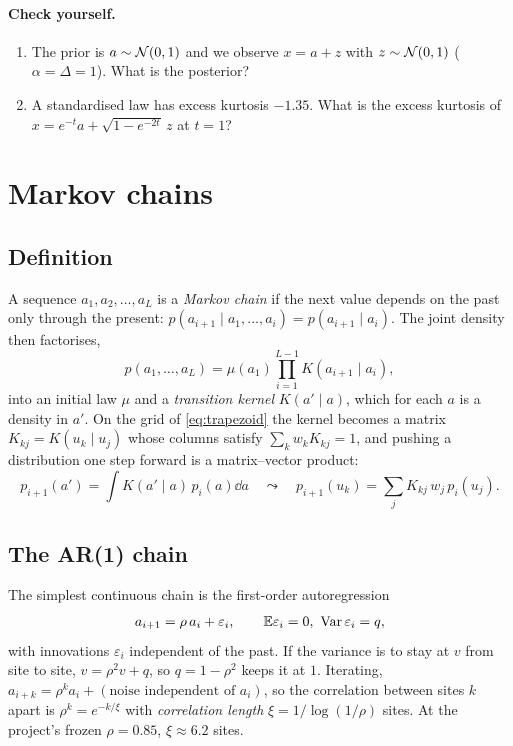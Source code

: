 \paragraph{Check yourself.}
\begin{enumerate}[label=\thesection.\arabic*,leftmargin=2.2em]
\item The prior is $a\sim\mathcal{N}(0,1)$ and we observe $x=a+z$ with $z\sim\mathcal{N}(0,1)$ ($\alpha=\Delta=1$). What is the posterior?
\item A standardised law has excess kurtosis $-1.35$. What is the excess kurtosis of $x=e^{-t}a+\sqrt{1-e^{-2t}}\,z$ at $t=1$?
\end{enumerate}

\section{Markov chains}\label{sec:markov}

\subsection{Definition}

A sequence $a_1,a_2,\dots,a_L$ is a \emph{Markov chain} if the next value depends on the past only through the
present: $p(a_{i+1}\mid a_1,\dots,a_i)=p(a_{i+1}\mid a_i)$. The joint density then factorises,
\begin{equation}\label{eq:chain}
  p(a_1,\dots,a_L)=\mu(a_1)\prod_{i=1}^{L-1}K(a_{i+1}\mid a_i),
\end{equation}
into an initial law $\mu$ and a \emph{transition kernel} $K(a'\mid a)$, which for each $a$ is a density in $a'$.
On the grid of \eqref{eq:trapezoid} the kernel becomes a matrix $K_{kj}=K(u_k\mid u_j)$ whose columns satisfy
$\sum_kw_kK_{kj}=1$, and pushing a distribution one step forward is a matrix--vector product:
\[
  p_{i+1}(a')=\int K(a'\mid a)\,p_i(a)\dd a\quad\leadsto\quad p_{i+1}(u_k)=\sum_jK_{kj}\,w_j\,p_i(u_j).
\]

\subsection{The AR(1) chain}

The simplest continuous chain is the first-order autoregression
\begin{equation}\label{eq:ar1}
  a_{i+1}=\rho\,a_i+\varepsilon_i,\qquad \E\varepsilon_i=0,\ \Var\varepsilon_i=q,
\end{equation}
with innovations $\varepsilon_i$ independent of the past. If the variance is to stay at $v$ from site to site,
$v=\rho^2v+q$, so $q=1-\rho^2$ keeps it at $1$. Iterating, $a_{i+k}=\rho^ka_i+(\text{noise independent of }a_i)$,
so the correlation between sites $k$ apart is $\rho^k=e^{-k/\xi}$ with \emph{correlation length}
$\xi=1/\log(1/\rho)$ sites. At the project's frozen $\rho=0.85$, $\xi\approx6.2$ sites.

